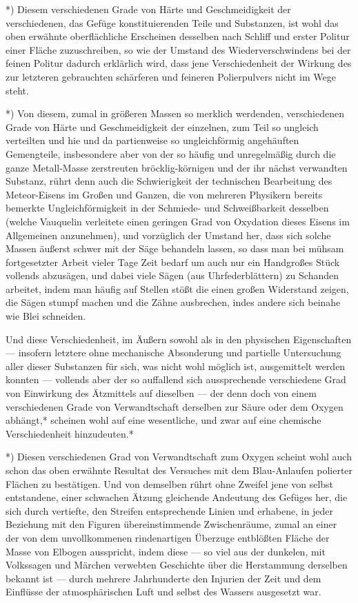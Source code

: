 \documentclass[a4paper, 11pt, oneside, german]{article}
\begin{document}
*) Diesem verschiedenen Grade von Härte und Geschmeidigkeit der verschiedenen, das Gefüge konstituierenden Teile und Substanzen, ist wohl das oben erwähnte oberflächliche Erscheinen desselben nach Schliff und erster Politur einer Fläche zuzuschreiben, so wie der Umstand des Wiederverschwindens bei der feinen Politur dadurch erklärlich wird, dass jene Verschiedenheit der Wirkung des zur letzteren gebrauchten schärferen und feineren Polierpulvers nicht im Wege steht.

*) Von diesem, zumal in größeren Massen so merklich werdenden, verschiedenen Grade von Härte und Geschmeidigkeit der einzelnen, zum Teil so ungleich verteilten und hie und da partienweise so ungleichförmig angehäuften Gemengteile, insbesondere aber von der so häufig und unregelmäßig durch die ganze Metall-Masse zerstreuten bröcklig-körnigen und der ihr nächst verwandten Substanz, rührt denn auch die Schwierigkeit der technischen Bearbeitung des Meteor-Eisens im Großen und Ganzen, die von mehreren Physikern bereits bemerkte Ungleichförmigkeit in der Schmiede- und Schweißbarkeit desselben (welche Vauquelin verleitete einen geringen Grad von Oxydation dieses Eisens im Allgemeinen anzunehmen), und vorzüglich der Umstand her, dass sich solche Massen äußerst schwer mit der Säge behandeln lassen, so dass man bei mühsam fortgesetzter Arbeit vieler Tage Zeit bedarf um auch nur ein Handgroßes Stück vollends abzusägen, und dabei viele Sägen (aus Uhrfederblättern) zu Schanden arbeitet, indem man häufig auf Stellen stößt die einen großen Widerstand zeigen, die Sägen stumpf machen und die Zähne ausbrechen, indes andere sich beinahe wie Blei schneiden.

Und diese Verschiedenheit, im Äußern sowohl als in den physischen Eigenschaften --- insofern letztere ohne mechanische Absonderung und partielle Untersuchung aller dieser Substanzen für sich, was nicht wohl möglich ist, ausgemittelt werden konnten --- vollends aber der so auffallend sich aussprechende verschiedene Grad von Einwirkung des Ätzmittels auf dieselben --- der denn doch von einem verschiedenen Grade von Verwandtschaft derselben zur Säure oder dem Oxygen abhängt,* scheinen wohl auf eine wesentliche, und zwar auf eine chemische Verschiedenheit hinzudeuten.*

*) Diesen verschiedenen Grad von Verwandtschaft zum Oxygen scheint wohl auch schon das oben erwähnte Resultat des Versuches mit dem Blau-Anlaufen polierter Flächen zu bestätigen. Und von demselben rührt ohne Zweifel jene von selbst entstandene, einer schwachen Ätzung gleichende Andeutung des Gefüges her, die sich durch vertiefte, den Streifen entsprechende Linien und erhabene, in jeder Beziehung mit den Figuren übereinstimmende Zwischenräume, zumal an einer der von dem unvollkommenen rindenartigen Überzuge entblößten Fläche der Masse von Elbogen ausspricht, indem diese --- so viel aus der dunkelen, mit Volkssagen und Märchen verwebten Geschichte über die Herstammung derselben bekannt ist --- durch mehrere Jahrhunderte den Injurien der Zeit und dem Einflüsse der atmosphärischen Luft und selbst des Wassers ausgesetzt war.
\end{document}
